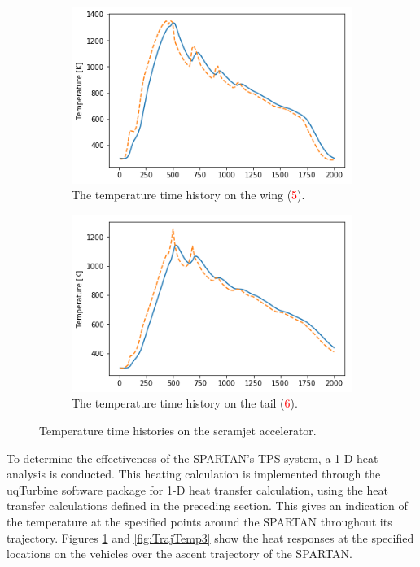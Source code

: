 \begin{figure}[!ht]
\begin{subfigure}{.5\textwidth}
	\end{subfigure}
	\begin{subfigure}{.5\textwidth}
		\centering
		\includegraphics[width=0.99\linewidth]{figures/A1_uncertainty-analysis/TPos3Return}
		\caption{The temperature time history on the wing (\textcolor{red}{5}).}
		
	\end{subfigure}
	\begin{subfigure}{.5\textwidth}
		\centering
		\includegraphics[width=0.99\linewidth]{figures/A1_uncertainty-analysis/TPos4Return}
		\caption{The temperature time history on the tail (\textcolor{red}{6}).}
		
	\end{subfigure}
	\caption{Temperature time histories on the scramjet accelerator.}
	\label{fig:TrajTemp}
\end{figure}


 
To determine the effectiveness of the SPARTAN's TPS system, a 1-D heat analysis is conducted.  
This heating calculation is implemented through the \textsf{uqTurbine} software package for 1-D heat transfer calculation, using the heat transfer calculations defined in the preceding section. 
This gives an indication of the temperature at the specified points around the SPARTAN throughout its trajectory. 
Figures \ref{fig:TrajTemp} and \ref{fig:TrajTemp3} show the heat responses at the specified locations on the vehicles over the ascent trajectory of the SPARTAN. 

